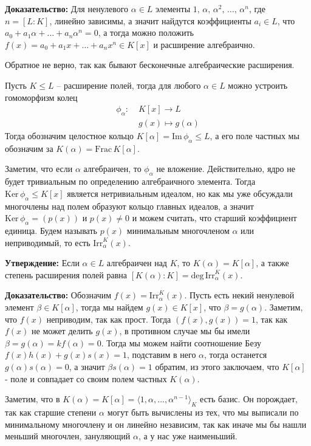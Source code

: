 \documentclass[a4paper, 12pt]{book}
\begin{document}
\textbf{Доказательство:} Для ненулевого $\alpha\in L$ элементы $1,\,\alpha,\,
\alpha^2,\,\ldots,\,\alpha^n$, где $n=[L:K]$, линейно зависимы, а значит
найдутся коэффициенты $a_i\in L$, что $a_0+a_1\alpha+\ldots+a_n\alpha^n=0$, 
а тогда можно положить $f(x)=a_0+a_1x+\ldots+a_nx^n\in K[x]$ и расширение
алгебраично.

Обратное не верно, так как бывают бесконечные алгебраические расширения.

Пусть $K\le L$ – расширение полей, тогда для любого $\alpha\in L$ можно
устроить гомоморфизм колец 
\begin{align*}
    \phi_\alpha:&\;K[x]\longrightarrow L\\
    &\;g(x)\mapsto g(\alpha)
\end{align*}
Тогда обозначим целостное кольцо $K[\alpha]=\text{Im}\,\phi_\alpha\le L$, а его
поле частных мы обозначим за $K(\alpha)=\text{Frac}\,K[\alpha]$.

Заметим, что если $\alpha$ алгебраичен, то $\phi_\alpha$ не вложение.
Действительно, ядро не будет тривиальным по определению алгебраичного элемента.
Тогда $\text{Ker}\,\phi_\alpha\le K[x]$ является нетривиальным идеалом, но как
мы уже обсуждали многочлены над полем образуют кольцо главных идеалов, а значит
$\text{Ker}\,\phi_\alpha=(p(x))$ и $p(x)\neq 0$ и можем считать, что старший
коэффициент единица. Будем называть $p(x)$ минимальным многочленом $\alpha$ или
неприводимый, то есть $\text{Irr}_\alpha^K(x)$.

\textbf{Утверждение:} Если $\alpha\in L$ алгебраичен над $K$, то $K(\alpha)=
K[\alpha]$, а также степень расширения полей равна $[K(\alpha):K]=\text{deg}\,
\text{Irr}_\alpha^K(x)$.

\textbf{Доказательство:} Обозначим $f(x)=\text{Irr}_\alpha^K(x)$. Пусть есть
некий ненулевой элемент $\beta\in K[\alpha]$, тогда мы найдем $g(x)\in K[x]$,
что $\beta=g(\alpha)$. Заметим, что $f(x)$ неприводим, так как прост. Тогда
$(f(x),g(x))=1$, так как $f(x)$ не может делить $g(x)$, в противном случае мы бы
имели $\beta=g(\alpha)=kf(\alpha)=0$. Тогда мы можем найти соотношение Безу
$f(x)h(x)+g(x)s(x)=1$, подставим в него $\alpha$, тогда останется $g(\alpha)
s(\alpha)=0$, а значит $\beta s(\alpha)=1$ обратим, из этого заключаем, что
$K[\alpha]$ - поле и совпадает со своим полем частных $K(\alpha)$.

Заметим, что в $K(\alpha)=K[\alpha]=\langle1,\alpha,...,\alpha^{n-1}\rangle_K$
есть базис. Он порождает, так как старшие степени $\alpha$ могут быть вычислены
из тех, что мы выписали по минимальному многочлену и он линейно независим, так
как иначе мы бы нашли меньший многочлен, зануляющий $\alpha$, а у нас уже
наименьший.
\end{document}

